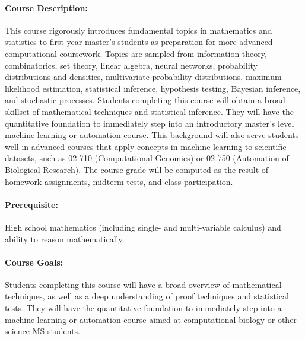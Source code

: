 \documentclass[12pt]{scrartcl}
\begin{document}
\paragraph{Course Description:} 
This course rigorously introduces fundamental topics in mathematics and statistics 
to first-year master's students as preparation for more advanced computational coursework. 
Topics are sampled from information theory, 
combinatorics, set theory, linear algebra, neural networks, probability distributions and densities, 
multivariate probability distributions, maximum likelihood estimation, statistical inference, hypothesis testing, 
Bayesian inference, and stochastic processes. 
Students completing this course will obtain a broad skillset of mathematical techniques and 
statistical inference. %
They will have the quantitative foundation to immediately step into 
an introductory master's level machine learning or automation course. 
This background will also serve students well in advanced courses that apply concepts in 
machine learning to scientific datasets, such as 
02-710 (Computational Genomics) or 02-750 (Automation of Biological Research). 
The course grade will be computed as the result of homework assignments, midterm tests, and class participation.


\paragraph{Prerequisite:} 
High school mathematics (including single- and multi-variable calculus) and ability to reason mathematically.

\paragraph{Course Goals:} 
Students completing this course will have a broad overview of mathematical techniques, 
as well as a deep understanding of proof techniques and statistical tests. 
They will have the quantitative foundation to immediately step into a machine learning or 
automation course aimed at computational biology or other science MS students. 

\tableofcontents
\end{document}
